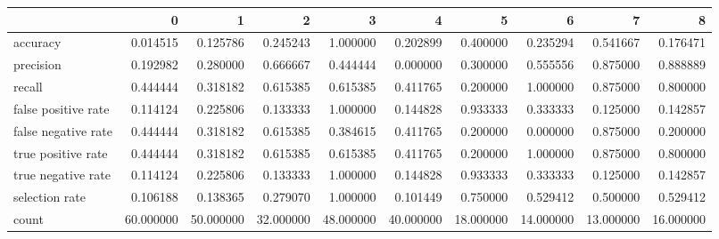 \begin{tabular}{lrrrrrrrrr}
\toprule
{} &          0 &          1 &          2 &          3 &          4 &          5 &          6 &          7 &          8 \\
\midrule
accuracy            &   0.014515 &   0.125786 &   0.245243 &   1.000000 &   0.202899 &   0.400000 &   0.235294 &   0.541667 &   0.176471 \\
precision           &   0.192982 &   0.280000 &   0.666667 &   0.444444 &   0.000000 &   0.300000 &   0.555556 &   0.875000 &   0.888889 \\
recall              &   0.444444 &   0.318182 &   0.615385 &   0.615385 &   0.411765 &   0.200000 &   1.000000 &   0.875000 &   0.800000 \\
false positive rate &   0.114124 &   0.225806 &   0.133333 &   1.000000 &   0.144828 &   0.933333 &   0.333333 &   0.125000 &   0.142857 \\
false negative rate &   0.444444 &   0.318182 &   0.615385 &   0.384615 &   0.411765 &   0.200000 &   0.000000 &   0.875000 &   0.200000 \\
true positive rate  &   0.444444 &   0.318182 &   0.615385 &   0.615385 &   0.411765 &   0.200000 &   1.000000 &   0.875000 &   0.800000 \\
true negative rate  &   0.114124 &   0.225806 &   0.133333 &   1.000000 &   0.144828 &   0.933333 &   0.333333 &   0.125000 &   0.142857 \\
selection rate      &   0.106188 &   0.138365 &   0.279070 &   1.000000 &   0.101449 &   0.750000 &   0.529412 &   0.500000 &   0.529412 \\
count               &  60.000000 &  50.000000 &  32.000000 &  48.000000 &  40.000000 &  18.000000 &  14.000000 &  13.000000 &  16.000000 \\
\bottomrule
\end{tabular}

